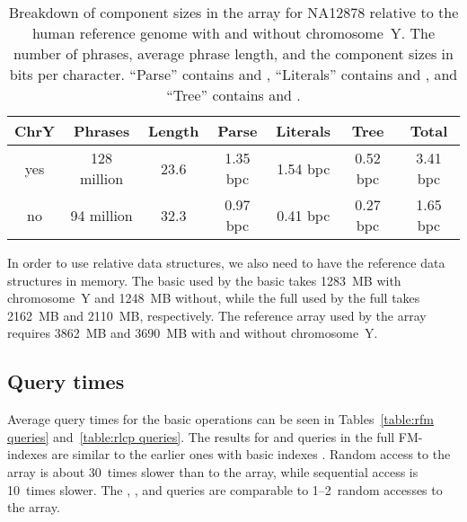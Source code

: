 \begin{table*}
\caption{Breakdown of component sizes in the \RLCP{} array for NA12878 relative
to the human reference genome with and without chromosome~Y. The number of phrases,
average phrase length, and the component sizes in bits per character. ``Parse''
contains  and , ``Literals'' contains  and , and ``Tree''
contains  and .}\label{table:rlcp components}
\setlength{\extrarowheight}{2pt}
\setlength{\tabcolsep}{3pt}
\begin{center}
\begin{tabular}{c|cc|ccc|c}
\hline
\textbf{ChrY} & \textbf{Phrases} & \textbf{Length} & \textbf{Parse} & \textbf{Literals} & \textbf{Tree} & \textbf{Total} \\
\hline
yes           &      128 million &            23.6 &      1.35 bpc &          1.54 bpc &      0.52 bpc &        3.41 bpc \\
no            &       94 million &            32.3 &      0.97 bpc &          0.41 bpc &      0.27 bpc &        1.65 bpc \\
\hline
\end{tabular}
\end{center}
\end{table*}

In order to use relative data structures, we also need to have the reference
data structures in memory. The basic \SSA{} used by the basic
\RFM{} takes 1283~MB with chromosome~Y and 1248~MB without, while the full
\SSA{} used by the full \RFM{} takes 2162~MB and 2110~MB, respectively. The
reference \LCP{} array used by the \RLCP{} array requires 3862~MB and 3690~MB
with and without chromosome~Y.


\subsection{Query times}

Average query times for the basic operations can be seen in Tables~\ref{table:rfm
queries} and~\ref{table:rlcp queries}. The results for \LF{} and \Psiop{} queries
in the full FM-indexes are similar to the earlier ones with basic indexes
\cite{Boucher2015}. Random access to the \RLCP{} array is about 30~times
slower than to the \LCP{} array, while sequential access is 10~times slower.
The \nsv, \psv, and \rmq{} queries are comparable to 1\nobreakdash--2~random
accesses to the \RLCP{} array.

